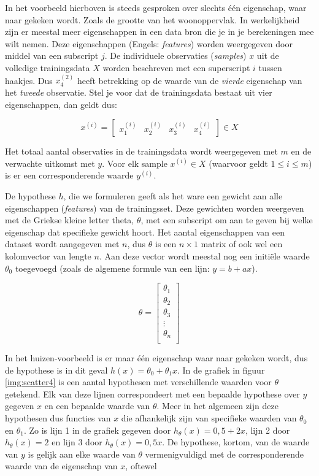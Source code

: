 In het voorbeeld hierboven is steeds gesproken over slechts één eigenschap, waar naar gekeken wordt. Zoals de grootte van het woonoppervlak. In werkelijkheid zijn er meestal meer eigenschappen in een data bron die je in je berekeningen mee wilt nemen. Deze eigenschappen (Engels: \textit{features}) worden weergegeven door middel van een subscript $j$. De individuele observaties (\textit{samples}) $x$ uit de volledige trainingsdata $X$ worden beschreven met een superscript $i$ tussen haakjes. Dus $x_4^{(2)}$ heeft betrekking op de waarde van de \textit{vierde} eigenschap van het \textit{tweede} observatie. Stel je voor dat de trainingsdata bestaat uit vier eigenschappen, dan geldt dus:

\[
x^{(i)}  = 
\begin{bmatrix}
x_1^{(i)} & x_2^{(i)} & x_3^{(i)} & x_4^{(i)}
\end{bmatrix} \in X
\]

Het totaal aantal observaties in de trainingsdata wordt weergegeven met $m$ en de verwachte uitkomst met $y$. Voor elk sample $x^{(i)} \in X$ (waarvoor geldt $1 \le i \le m$) is er een corresponderende waarde $y^{(i)}$.

De hypothese $h$, die we formuleren geeft als het ware een gewicht aan alle eigenschappen (\textit{features}) van de trainingsset. Deze gewichten worden weergeven met de Griekse kleine letter theta, $\theta$, met een subscript om aan te geven bij welke eigenschap dat specifieke gewicht hoort. Het aantal eigenschappen van een dataset wordt aangegeven met $n$, dus $\theta$ is een $n \times 1$ matrix of ook wel een kolomvector van lengte $n$. Aan deze vector wordt meestal nog een initiële waarde $\theta_0$ toegevoegd (zoals de algemene formule van een lijn: $y=b+ax$).

\[
\theta=
\begin{bmatrix}
\theta_1 \\
\theta_2 \\
\theta_3 \\
\vdots \\
\theta_n \\
\end{bmatrix}
\]



In het huizen-voorbeeld is er maar één eigenschap waar naar gekeken wordt, dus de hypothese is in dit geval $h(x) = \theta_0 + \theta_1x$. In de grafiek in figuur \ref{img:scatter4} is een aantal hypothesen met verschillende waarden voor $\theta$ getekend. Elk van deze lijnen correspondeert met een bepaalde hypothese over $y$ gegeven $x$ en een bepaalde waarde van $\theta$. Meer in het algemeen zijn deze hypothesen dus functies van $x$ die afhankelijk zijn van specifieke waarden van $\theta_0$ en $\theta_1$. Zo is lijn 1 in de grafiek gegeven door $h_\theta(x)=0,5+2x$, lijn 2 door $h_\theta(x)=2$ en lijn 3 door $h_\theta(x)=0,5x$. De hypothese, kortom, van de waarde van $y$ is gelijk aan elke waarde van $\theta$ vermenigvuldigd met de corresponderende waarde van de eigenschap van $x$, oftewel

